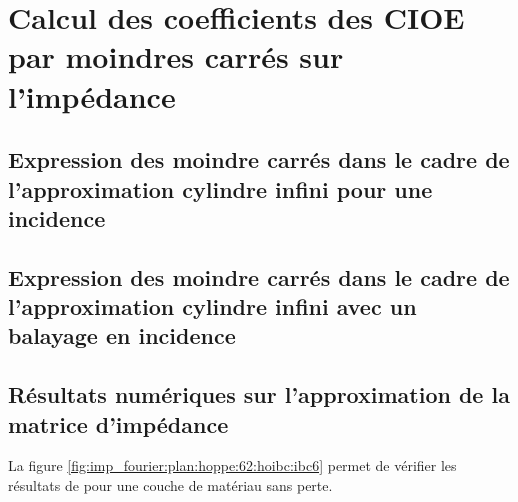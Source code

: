 \section{Calcul des coefficients des CIOE par moindres carrés sur l'impédance}

  \subsection{Expression des moindre carrés dans le cadre de l'approximation cylindre infini pour une incidence}

  \subsection{Expression des moindre carrés dans le cadre de l'approximation cylindre infini avec un balayage en incidence}

  \subsection{Résultats numériques sur l'approximation de la matrice d'impédance}

    La figure \ref{fig:imp_fourier:plan:hoppe:62:hoibc:ibc6} permet de vérifier les résultats de \cite[p.~62]{hoppe_impedance_1995} pour une couche de matériau sans perte.


